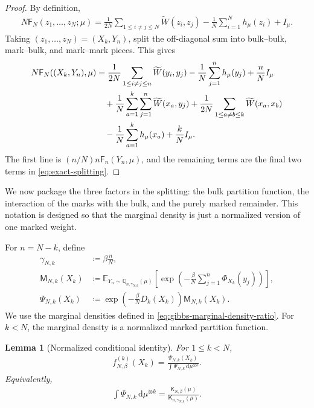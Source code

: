 \documentclass[11pt,reqno]{amsart}
\numberwithin{equation}{section}
\theoremstyle{plain}
\newtheorem{lemma}[lemma]{Lemma}
\theoremstyle{remark}
\newcommand{\md}{\mathrm{d}}
\newcommand{\E}{{\mathbb{E}}}
\newcommand{\Q}{{\mathbb{Q}}}
\newcommand{\K}{{\mathsf{K}}}
\newcommand{\tl}{\widetilde}
\newcommand{\Fr}{{\mathsf{F}}}
\newcommand{\Xk}{X_k}
\newcommand{\be}{\beta}
\begin{document}
\begin{proof}
By definition,
\begin{align}
N\Fr_N(z_1,\ldots,z_N;\mu)
=\frac1{2N}\sum_{1\le i\ne j\le N}\tl W(z_i,z_j)-\frac1N\sum_{i=1}^N h_\mu(z_i)+I_\mu.
\end{align}
Taking \((z_1,\ldots,z_N)=(\Xk,Y_n)\), split the off-diagonal sum into bulk--bulk, mark--bulk, and mark--mark pieces.  This gives
\begin{align}
N\Fr_N((\Xk,Y_n),\mu)
&=\frac1{2N}\sum_{1\le i\ne j\le n}\tl W(y_i,y_j)-\frac1N\sum_{j=1}^n h_\mu(y_j)+\frac{n}{N}I_\mu \notag\\
&\quad +\frac1N\sum_{a=1}^k\sum_{j=1}^n\tl W(x_a,y_j)
+\frac1{2N}\sum_{1\le a\ne b\le k}\tl W(x_a,x_b) \notag\\
&\quad -\frac1N\sum_{a=1}^k h_\mu(x_a)+\frac{k}{N}I_\mu.
\end{align}
The first line is \((n/N)n\Fr_n(Y_n,\mu)\), and the remaining terms are the final two terms in \eqref{eq:exact-splitting}.
\end{proof}

We now package the three factors in the splitting: the bulk
partition function, the interaction of the marks with the bulk, and the purely
marked remainder.  This notation is designed so that the marginal density is
just a normalized version of one marked weight.

For \(n=N-k\), define
\begin{align}
 \gamma_{N,k}&\coloneqq \be\frac{n}{N},\label{eq:gamma-Nk-def}\\
 \mathsf M_{N,k}(\Xk)&\coloneqq
 \E_{Y_n\sim\Q_{n,\gamma_{N,k}}(\mu)}
 \left[\exp\left(-\frac{\be}{N}\sum_{j=1}^n\Phi_{\Xk}(y_j)\right)\right],\label{eq:M-Nk-def}\\
 \Psi_{N,k}(\Xk)&\coloneqq
 \exp\left(-\frac{\be}{N}D_k(\Xk)\right)\mathsf M_{N,k}(\Xk).
 \label{eq:Psi-Nk-def}
\end{align}
We use the marginal densities defined in \eqref{eq:gibbs-marginal-density-ratio}.  For $k<N$, the marginal density is a normalized marked partition function.

\begin{lemma}[Normalized conditional identity]\label{lem:normalized-conditional-identity}
For \(1\le k<N\),
\begin{align}\label{eq:f-Psi-normalized}
 f_{N,\be}^{(k)}(\Xk)=\frac{\Psi_{N,k}(\Xk)}{\int\Psi_{N,k}\,\md\mu^{\otimes k}}.
\end{align}
Equivalently,
\begin{align}\label{eq:Psi-mean-partition-ratio}
 \int\Psi_{N,k}\,\md\mu^{\otimes k}=\frac{\K_{N,\be}(\mu)}{\K_{n,\gamma_{N,k}}(\mu)}.
\end{align}
\end{lemma}
\end{document}
